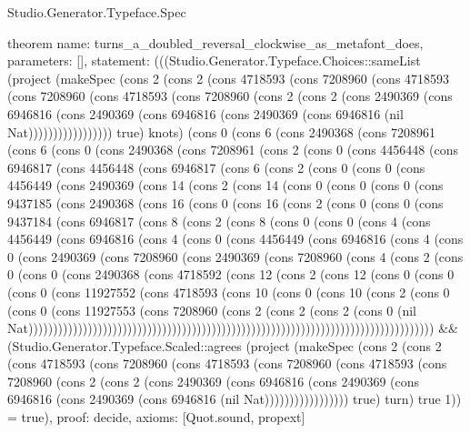 \begin{lexlean}{Studio.Generator.Typeface.Spec}
\begin{semanticmodule}
theorem{
  name: turns_a_doubled_reversal_clockwise_as_metafont_does,
  parameters: [],
  statement: (((Studio.Generator.Typeface.Choices::sameList (project (makeSpec (cons 2 (cons 2 (cons 4718593 (cons 7208960 (cons 4718593 (cons 7208960 (cons 4718593 (cons 7208960 (cons 2 (cons 2 (cons 2490369 (cons 6946816 (cons 2490369 (cons 6946816 (cons 2490369 (cons 6946816 (nil Nat))))))))))))))))) true) knots) (cons 0 (cons 6 (cons 2490368 (cons 7208961 (cons 6 (cons 0 (cons 2490368 (cons 7208961 (cons 2 (cons 0 (cons 4456448 (cons 6946817 (cons 4456448 (cons 6946817 (cons 6 (cons 2 (cons 0 (cons 0 (cons 4456449 (cons 2490369 (cons 14 (cons 2 (cons 14 (cons 0 (cons 0 (cons 0 (cons 9437185 (cons 2490368 (cons 16 (cons 0 (cons 16 (cons 2 (cons 0 (cons 0 (cons 9437184 (cons 6946817 (cons 8 (cons 2 (cons 8 (cons 0 (cons 0 (cons 4 (cons 4456449 (cons 6946816 (cons 4 (cons 0 (cons 4456449 (cons 6946816 (cons 4 (cons 0 (cons 2490369 (cons 7208960 (cons 2490369 (cons 7208960 (cons 4 (cons 2 (cons 0 (cons 0 (cons 2490368 (cons 4718592 (cons 12 (cons 2 (cons 12 (cons 0 (cons 0 (cons 0 (cons 11927552 (cons 4718593 (cons 10 (cons 0 (cons 10 (cons 2 (cons 0 (cons 0 (cons 11927553 (cons 7208960 (cons 2 (cons 2 (cons 2 (cons 0 (nil Nat)))))))))))))))))))))))))))))))))))))))))))))))))))))))))))))))))))))))))))))))))) && (Studio.Generator.Typeface.Scaled::agrees (project (makeSpec (cons 2 (cons 2 (cons 4718593 (cons 7208960 (cons 4718593 (cons 7208960 (cons 4718593 (cons 7208960 (cons 2 (cons 2 (cons 2490369 (cons 6946816 (cons 2490369 (cons 6946816 (cons 2490369 (cons 6946816 (nil Nat))))))))))))))))) true) turn) true 1)) = true),
  proof: decide{},
  axioms: [Quot.sound, propext]
}


\end{semanticmodule}
\end{lexlean}
